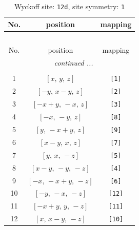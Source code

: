 \documentclass[fleqn,8pt]{jsarticle}
\begin{document}
\renewcommand{\arraystretch}{1.2}
\begin{longtable}{ccc}
\caption{Wyckoff site: {\tt 12d}, site symmetry: {\tt 1}}
 \\
 \hline \hline
No. & position & mapping \\ \hline \endfirsthead

\multicolumn{2}{l}{\tablename\ \thetable{}} \\
 \hline \hline
No. & position & mapping \\ \hline \endhead

 \hline \hline
\multicolumn{2}{r}{\footnotesize\it continued ...} \\ \endfoot

 \hline \hline
\multicolumn{2}{r}{} \\ \endlastfoot

1 & $\left[ x,\, y,\, z \right]$ & {\tt [1]} \\ \hline
2 & $\left[ - y,\, x - y,\, z \right]$ & {\tt [2]} \\ \hline
3 & $\left[ - x + y,\, - x,\, z \right]$ & {\tt [3]} \\ \hline
4 & $\left[ - x,\, - y,\, z \right]$ & {\tt [8]} \\ \hline
5 & $\left[ y,\, - x + y,\, z \right]$ & {\tt [9]} \\ \hline
6 & $\left[ x - y,\, x,\, z \right]$ & {\tt [7]} \\ \hline
7 & $\left[ y,\, x,\, - z \right]$ & {\tt [5]} \\ \hline
8 & $\left[ x - y,\, - y,\, - z \right]$ & {\tt [4]} \\ \hline
9 & $\left[ - x,\, - x + y,\, - z \right]$ & {\tt [6]} \\ \hline
10 & $\left[ - y,\, - x,\, - z \right]$ & {\tt [12]} \\ \hline
11 & $\left[ - x + y,\, y,\, - z \right]$ & {\tt [11]} \\ \hline
12 & $\left[ x,\, x - y,\, - z \right]$ & {\tt [10]} \\
\end{longtable}
\end{document}
